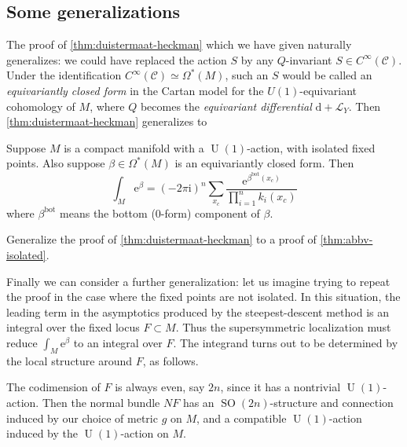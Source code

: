 \documentclass[12pt,letterpaper,reqno]{article}
\numberwithin{equation}{section}
\newcommand{\cC}{\ensuremath{\mathcal C}}
\newcommand{\cL}{\ensuremath{\mathcal L}}
\newcommand{\I}{{\mathrm i}}
\newcommand{\e}{{\mathrm e}}
\newcommand{\de}{\mathrm{d}}
\newcommand{\rmbot}{\mathrm{bot}}
\newcommand{\ti}[1]{\textit{#1}}
\DeclareMathOperator{\SO}{SO}
\DeclareMathOperator{\U}{U}
\newcommand{\fixme}[1]{{\color{orange}{[#1]}}}
\begin{document}
\subsection{Some generalizations}

The proof of \autoref{thm:duistermaat-heckman} which we have
given naturally generalizes: we could have replaced the action $S$
by any $Q$-invariant $S \in C^\infty(\cC)$.
Under the identification $C^\infty(\cC) \simeq \Omega^*(M)$,
such an $S$ would be called an \ti{equivariantly closed form}
in the Cartan model for the $U(1)$-equivariant cohomology of $M$,
where $Q$ becomes the \ti{equivariant differential} $\de + \cL_Y$.
Then \autoref{thm:duistermaat-heckman} generalizes to

\begin{thm} \label{thm:abbv-isolated}
Suppose $M$ is a compact manifold with a $\U(1)$-action, with isolated
fixed points.
Also suppose $\beta \in \Omega^*(M)$ is an equivariantly closed form.
Then
\begin{equation}
\int_M \e^{\beta} = \left( -2\pi \I \right)^{n} \sum_{x_c} \frac{\e^{\beta^\rmbot(x_c)}}{\prod_{i=1}^n k_i(x_c)}
\end{equation}
where $\beta^\rmbot$ means the bottom ($0$-form) component
of $\beta$.
\end{thm}

\begin{exercise} Generalize the proof
of \autoref{thm:duistermaat-heckman} to a proof of \autoref{thm:abbv-isolated}.
\end{exercise}

Finally we can consider a further generalization: let us imagine 
trying to repeat the proof in the case where the fixed points
are not isolated.
In this situation, the leading term in the asymptotics
produced by the steepest-descent method is an integral over the 
fixed locus $F \subset M$.
Thus the supersymmetric localization must reduce $\int_M \e^\beta$
to an integral over $F$. The integrand turns out to be determined by the
local structure around $F$, as follows.

The codimension of
$F$ is always even, say $2n$, since it has a nontrivial $\U(1)$-action.
Then the normal bundle $NF$
has an $\SO(2n)$-structure and connection 
induced by our choice of metric $g$ on $M$,
and a compatible $\U(1)$-action induced by the $\U(1)$-action 
on $M$. \fixme{worry about orientations}
\end{document}
